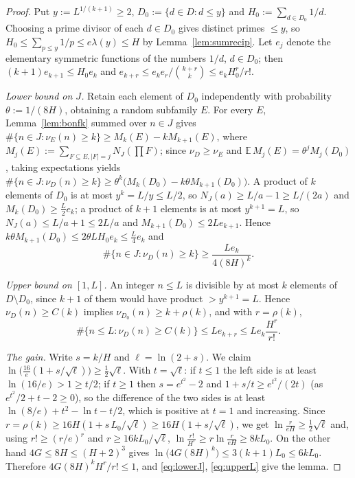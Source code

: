 \documentclass[11pt]{article}
\theoremstyle{definition}
\begin{document}
\begin{proof}
Put $y:=L^{1/(k+1)}\ge2$, $D_0:=\{d\in D:d\le y\}$ and $H_0:=\sum_{d\in D_0}1/d$. Choosing a prime divisor of each $d\in D_0$
gives distinct primes $\le y$, so $H_0\le\sum_{p\le y}1/p\le e\lambda(y)\le H$ by Lemma~\ref{lem:sumrecip}. Let $e_j$ denote
the elementary symmetric functions of the numbers $1/d$, $d\in D_0$; then $(k+1)e_{k+1}\le H_0e_k$ and
$e_{k+r}\le e_ke_r/\binom{k+r}k\le e_kH_0^r/r!$.

\emph{Lower bound on $J$.} Retain each element of $D_0$ independently with probability $\theta:=1/(8H)$, obtaining a random
subfamily $E$. For every $E$, Lemma~\ref{lem:bonfk} summed over $n\in J$ gives
$\#\{n\in J:\nu_E(n)\ge k\}\ge M_k(E)-kM_{k+1}(E)$, where $M_j(E):=\sum_{F\subseteq E,|F|=j}N_J(\prod F)$; since $\nu_D\ge\nu_E$
and $\mathbb E\,M_j(E)=\theta^jM_j(D_0)$, taking expectations yields
$\#\{n\in J:\nu_D(n)\ge k\}\ge\theta^k\bigl(M_k(D_0)-k\theta M_{k+1}(D_0)\bigr)$. A product of $k$ elements of $D_0$ is at most
$y^k=L/y\le L/2$, so $N_J(a)\ge L/a-1\ge L/(2a)$ and $M_k(D_0)\ge\tfrac L2e_k$; a product of $k+1$ elements is at most $y^{k+1}=L$,
so $N_J(a)\le L/a+1\le2L/a$ and $M_{k+1}(D_0)\le2Le_{k+1}$. Hence $k\theta M_{k+1}(D_0)\le2\theta LH_0e_k\le\tfrac L4e_k$ and
\begin{equation}\label{eq:lowerJ}
\#\{n\in J:\nu_D(n)\ge k\}\ge\frac{Le_k}{4(8H)^k}.
\end{equation}

\emph{Upper bound on $[1,L]$.} An integer $n\le L$ is divisible by at most $k$ elements of $D\setminus D_0$, since $k+1$ of them
would have product $>y^{k+1}=L$. Hence $\nu_D(n)\ge C(k)$ implies $\nu_{D_0}(n)\ge k+\rho(k)$, and with $r=\rho(k)$,
\begin{equation}\label{eq:upperL}
\#\{n\le L:\nu_D(n)\ge C(k)\}\le Le_{k+r}\le Le_k\frac{H^{r}}{r!}.
\end{equation}

\emph{The gain.} Write $s=k/H$ and $\ell=\ln(2+s)$. We claim $\ln\bigl(\tfrac{16}e(1+s/\sqrt\ell)\bigr)\ge\tfrac12\sqrt\ell$.
With $t=\sqrt\ell$: if $t\le1$ the left side is at least $\ln(16/e)>1\ge t/2$; if $t\ge1$ then $s=e^{t^2}-2$ and
$1+s/t\ge e^{t^2}/(2t)$ (as $e^{t^2}/2+t-2\ge0$), so the difference of the two sides is at least
$\ln(8/e)+t^2-\ln t-t/2$, which is positive at $t=1$ and increasing. Since $r=\rho(k)\ge16H(1+s\,L_0/\sqrt\ell)\ge16H(1+s/\sqrt\ell)$,
we get $\ln\frac r{eH}\ge\tfrac12\sqrt\ell$ and, using $r!\ge(r/e)^r$ and $r\ge16kL_0/\sqrt\ell$,
$\ln\frac{r!}{H^r}\ge r\ln\frac r{eH}\ge8kL_0$. On the other hand $4G\le8H\le(H+2)^3$ gives
$\ln\bigl(4G(8H)^k\bigr)\le3(k+1)L_0\le6kL_0$. Therefore $4G(8H)^kH^r/r!\le1$, and \eqref{eq:lowerJ}, \eqref{eq:upperL} give the lemma.
\end{proof}
\end{document}
